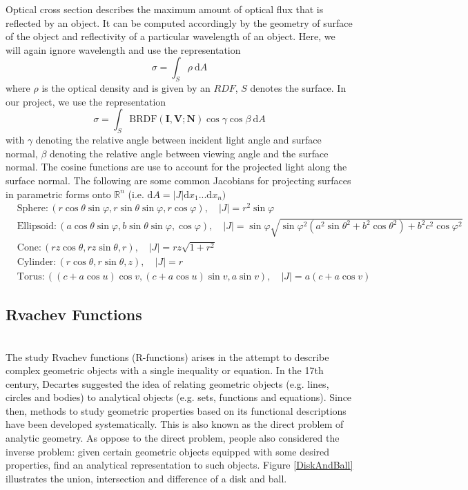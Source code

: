 \documentclass[11pt,reqno]{amsart}
\newcommand{\BRDF}{\mathrm{BRDF}}
\theoremstyle{definition}
\begin{document}
Optical cross section describes the maximum amount of optical flux that is reflected by an object. It can be computed accordingly by the geometry of surface of the object and reflectivity of a particular wavelength of an object. Here, we will again ignore wavelength and use the representation 
$$\sigma=\int_{S} \rho \: \mathrm{d}A$$
where $\rho$ is the optical density and is given by an $RDF$, $S$ denotes the surface. In our project, we use the representation
$$\sigma= \int_S\BRDF(\mathbf{I},\mathbf{V};\mathbf{N}) \cos\gamma\cos\beta \: \mathrm{d}A$$
with $\gamma$ denoting the relative angle between incident light angle and surface normal, $\beta$ denoting the relative angle between viewing angle and the surface normal. The cosine functions are use to account for the projected light along the surface normal. The following are some common Jacobians for projecting surfaces in parametric forms onto $\mathbb{R}^n$ (i.e. $\mathrm d A= |J| \mathrm{d}x_1...\mathrm{d}x_n)$
\begin{align}
&\nonumber\mbox{Sphere}:( r\cos\theta \sin\varphi, r\sin\theta \sin\varphi,  r\cos\varphi),   \quad |J|= r^2\sin\varphi         \\
&\nonumber\mbox{Ellipsoid} :(a\cos\theta \sin\varphi,b\sin\theta \sin\varphi,\cos\varphi),    \quad |J|=\sin\varphi  \sqrt{\sin\varphi^2( a^2\sin\theta^2+b^2\cos\theta^2)+b^2c^2\cos\varphi^2}       \\ 
&\nonumber\mbox{Cone}: (rz\cos\theta , rz\sin\theta , r),\quad |J|= rz\sqrt{1+r^2}        \\
&\nonumber\mbox{Cylinder}: ( r\cos\theta ,r\sin\theta, z), \quad |J|=r                \\
&\nonumber\mbox{Torus} :    ((c+a\cos u) \cos v,(c+a\cos u) \sin v, a\sin v), \quad |J|= a(c+a\cos v)           
\end{align}

\subsection{Rvachev Functions}~\\
The study Rvachev functions (R-functions) arises in the attempt
to describe complex geometric objects with a single inequality or equation. In the
17th century, Decartes suggested the idea of relating geometric objects (e.g.
lines, circles and bodies) to analytical objects (e.g. sets, functions and
equations). Since then, methods to study geometric properties based on its
functional descriptions have been developed systematically. This is also known
as the direct problem of analytic geometry. As oppose to the direct problem,
people also considered the inverse problem: given certain geometric objects
equipped with some desired properties, find an analytical representation to
such objects. Figure \ref{DiskAndBall} illustrates the union, intersection and difference of a disk and ball. 
\end{document}
